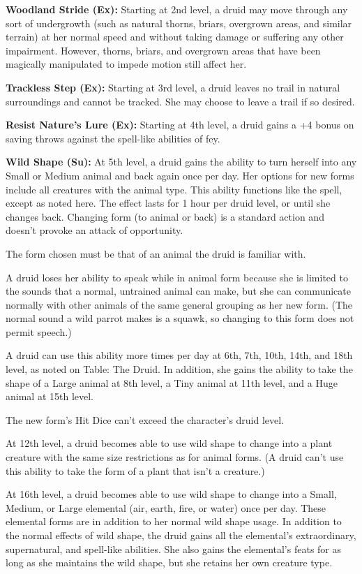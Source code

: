 \textbf{Woodland Stride (Ex):} Starting at 2nd level, a druid may move through any sort of undergrowth (such as natural thorns, briars, overgrown areas, and similar terrain) at her normal speed and without taking damage or suffering any other impairment. However, thorns, briars, and overgrown areas that have been magically manipulated to impede motion still affect her.

\textbf{Trackless Step (Ex):} Starting at 3rd level, a druid leaves no trail in natural surroundings and cannot be tracked. She may choose to leave a trail if so desired.

\textbf{Resist Nature's Lure (Ex):} Starting at 4th level, a druid gains a +4 bonus on saving throws against the spell-like abilities of fey.

\textbf{Wild Shape (Su):} At 5th level, a druid gains the ability to turn herself into any Small or Medium animal and back again once per day. Her options for new forms include all creatures with the animal type. This ability functions like the  spell, except as noted here. The effect lasts for 1 hour per druid level, or until she changes back. Changing form (to animal or back) is a standard action and doesn't provoke an attack of opportunity.

The form chosen must be that of an animal the druid is familiar with. 

A druid loses her ability to speak while in animal form because she is limited to the sounds that a normal, untrained animal can make, but she can communicate normally with other animals of the same general grouping as her new form. (The normal sound a wild parrot makes is a squawk, so changing to this form does not permit speech.)

A druid can use this ability more times per day at 6th, 7th, 10th, 14th, and 18th level, as noted on Table: The Druid. In addition, she gains the ability to take the shape of a Large animal at 8th level, a Tiny animal at 11th level, and a Huge animal at 15th level.

The new form's Hit Dice can't exceed the character's druid level.

At 12th level, a druid becomes able to use wild shape to change into a plant creature with the same size restrictions as for animal forms. (A druid can't use this ability to take the form of a plant that isn't a creature.)

At 16th level, a druid becomes able to use wild shape to change into a Small, Medium, or Large elemental (air, earth, fire, or water) once per day. These elemental forms are in addition to her normal wild shape usage. In addition to the normal effects of wild shape, the druid gains all the elemental's extraordinary, supernatural, and spell-like abilities. She also gains the elemental's feats for as long as she maintains the wild shape, but she retains her own creature type.

